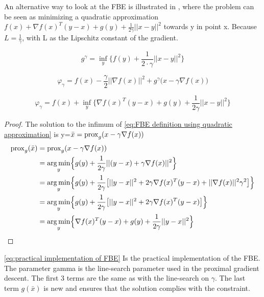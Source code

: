 		An alternative way to look at the FBE is illustrated in \cite{AjaySathya2017}, where the problem can be seen as minimizing a quadratic approximation  $f(x) +  \nabla f(x)^T(y-x) + g(y) + \frac{1}{2 \gamma} ||x-y||^2  $ towards y in point x.  Because $L = \frac{1}{\gamma}$, with L as the Lipschitz constant of the gradient.
		
		\begin{equation}
			g^{\gamma} = \underset{y}{\inf} \big \{f(y)+\frac{1}{2 \cdot \gamma}||x-y||^2 \big \}
			\label{eq:Moreau envelope}
		\end{equation}
		
		\begin{equation}
		\varphi_{\gamma} = f(x) - \frac{\gamma}{2}||\nabla f(x)||^2 + g^{\gamma} \big(x-\gamma \nabla f(x) \big)
		\label{eq:FBE definition using Moreau envelope}
		\end{equation}
		
		\begin{equation}
		\varphi_{\gamma} =   f(x) + \underset{y}{\inf} \Big\{ \nabla f(x)^T(y-x) + g(y) + \frac{1}{2 \gamma} ||x-y||^2  \Big\}
		\label{eq:FBE definition using quadratic approximation}
		\end{equation}
		
		\begin{proof}
			The solution to the infimum of \eqref{eq:FBE definition using quadratic approximation} is y=$\bar{x}= \operatorname{prox}_g(x-\gamma \nabla f(x))$
			\begin{align*}
			\operatorname{prox}_g(\bar{x}) 
			&=\operatorname{prox}_g(x- \gamma \nabla f(x)) \\
			&= \underset{y}{\operatorname*{arg\,min}} \Big \{ g(y) 
			+ \frac{1}{2 \gamma}||(y-x) + \gamma \nabla f(x)||^2 \Big \} \\
			&= \underset{y}{\operatorname*{arg\,min}} \Big \{ g(y) 
			+ \frac{1}{2 \gamma} \big[||y-x||^2 + 2 \gamma \nabla f(x)^T(y-x) + ||\nabla f(x)||^2\gamma^2 \big] \Big \} \\
			&= \underset{y}{\operatorname*{arg\,min}} \Big \{ g(y) 
			+ \frac{1}{2 \gamma} \big[||y-x||^2 + 2 \gamma \nabla f(x)^T(y-x)  \big] \Big \}\\
			&= \underset{y}{\operatorname*{arg\,min}} \Big \{   \nabla f(x)^T(y-x)  + g(y) 
			+ \frac{1}{2 \gamma} ||y-x||^2  \Big  \}
			\end{align*}
			\label{prf:prox is solution to FBE inf}
		\end{proof}
		
		\eqref{eq:practical implementation of FBE} Is the practical implementation of the FBE. The parameter gamma is the line-search parameter used in the proximal gradient descent. The first 3 terms are the same as with the line-search on $\gamma$. The last term $g(\bar{x})$ is new and ensures that the solution complies with the constraint.
		
